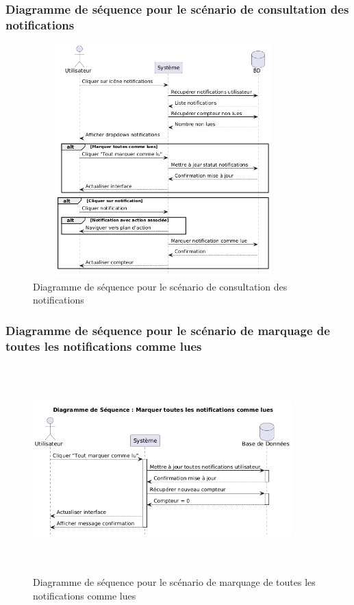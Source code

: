 \subsubsection{Diagramme de séquence pour le scénario de consultation des notifications}
\begin{figure}[H]
    \centering
    \includegraphics[width=10cm,height=9cm]{images/consultnotificationsseq.png}
    \caption{Diagramme de séquence pour le scénario de consultation des notifications}
\end{figure}

\subsubsection{Diagramme de séquence pour le scénario de marquage de toutes les notifications comme lues}
\begin{figure}[H]
    \centering
    \includegraphics[width=10cm,height=8cm]{images/markallreadseq.png}
    \caption{Diagramme de séquence pour le scénario de marquage de toutes les notifications comme lues}
\end{figure}

